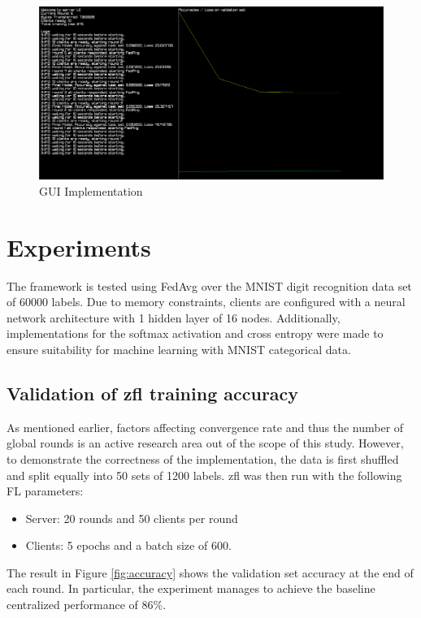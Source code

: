 \documentclass[12pt]{article}
\begin{document}
\begin{figure}
  \includegraphics[scale=0.3]{gui}
  \caption{GUI Implementation}
  \label{fig:gui}
\centering
\end{figure}

\pagebreak
\section{Experiments}\label{experiments}
The framework is tested using FedAvg over the MNIST digit recognition data set of 60000 labels. Due to memory
constraints, clients are configured with a neural network architecture with 1 hidden layer of 16
nodes. Additionally, implementations for the softmax activation and cross entropy were made to
ensure suitability for machine learning with MNIST categorical data.\\

\subsection{Validation of zfl training accuracy}
As mentioned earlier, factors affecting convergence rate and thus the number of global rounds is an active research
area out of the scope of this study. However, to demonstrate the correctness of the implementation,
the data is first shuffled and split equally into 50 sets of 1200 labels.
zfl was then run with the following FL parameters:
\begin{itemize}
  \item Server: 20 rounds and 50 clients per round
  \item Clients: 5 epochs and a batch size of 600.
\end{itemize}
The result in Figure \ref{fig:accuracy} shows the
validation set accuracy at the end of each round. In particular, the experiment manages to achieve
the baseline centralized performance of 86\%.
\end{document}
